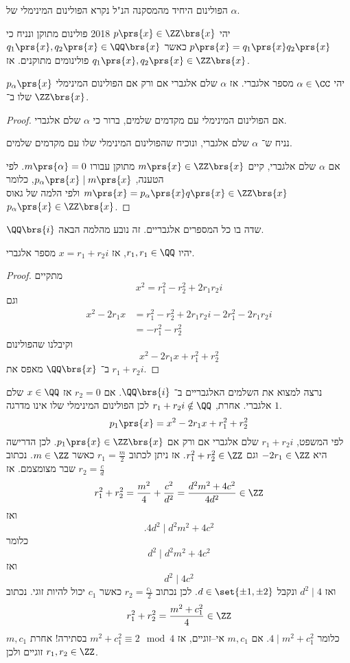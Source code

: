 \documentclass[a4paper,10pt,twoside,openany]{book}
\begin{document}
\begin{definition}
הפולינום היחיד מהמסקנה הנ"ל נקרא הפולינום המינימלי של
$\alpha$.
\end{definition}
\begin{lemma}[גאוס]
יהי
$p\prs{x} \in \ZZ\brs{x}$%
%
{2018}
פולינום מתוקן ונניח כי
$p\prs{x} = q_1\prs{x} q_2\prs{x}$
כאשר
$q_1\prs{x}, q_2\prs{x} \in \QQ\brs{x}$
פולינומים מתוקנים.
אז
$q_1\prs{x}, q_2\prs{x} \in \ZZ\brs{x}$.
\end{lemma}
\begin{proposition}
יהי
$\alpha \in \CC$
מספר אלגברי.
אז
$\alpha$
שלם אלגברי אם ורק אם הפולינום המינימלי
$p_{\alpha}\prs{x}$
שלו ב־%
$\ZZ\brs{x}$.
\end{proposition}

\begin{proof}
אם הפולינום המינימלי עם מקדמים שלמים, ברור כי
$\alpha$
שלם אלגברי.

נניח ש־%
$\alpha$
שלם אלגברי, ונוכיח שהפולינום המינימלי שלו עם מקדמים שלמים.

אם
$\alpha$
שלם אלגברי, קיים
$m\prs{x} \in \ZZ\brs{x}$
מתוקן עבורו
$m\prs{\alpha} = 0$.
לפי הטענה,
$p_{\alpha}\prs{x} \mid m\prs{x}$,
כלומר
$m\prs{x} = p_{\alpha}\prs{x} q\prs{x} \in \ZZ\brs{x}$
ולפי הלמה של גאוס
$p_{\alpha}\prs{x} \in \ZZ\brs{x}$.
\end{proof}

\begin{example}
$\QQ\brs{i}$
שדה בו כל המספרים אלגבריים.
זה נובע מהלמה הבאה.
\end{example}
\begin{lemma}
יהיו
$r_1,r_1 \in \QQ$,
אז
$x = r_1 + r_2 i$
מספר אלגברי.
\end{lemma}
\begin{proof}
מתקיים
\[x^2 = r_1^2 - r_2^2 + 2r_1 r_2 i\]
וגם
\begin{align*}
x^2 -2r_1 x &= r_1^2 - r_2^2 + 2r_1r_2 i - 2r_1^2 - 2r_1r_2 i \\&= -r_1^2 - r_2^2
\end{align*}
וקיבלנו שהפולינום
\[x^2 - 2r_1 x + r_1^2 + r_2^2\]
ב־%
$\QQ\brs{x}$
מאפס את
$r_1 + r_2 i$.
\end{proof}

\begin{example}
נרצה למצוא את השלמים האלגבריים ב־%
$\QQ\brs{i}$.
אם
$r_2 = 0$
אז
$x \in \QQ$
שלם אלגברי.
אחרת,
$r_1 + r_2 i \notin \QQ$
לכן הפולינום המינימלי שלו אינו מדרגה
$1$.
\[p_1\prs{x} = x^2 - 2r_1 x + r_1^2 + r_2^2\]
לפי המשפט,
$r_1 + r_2 i$
שלם אלגברי אם ורק אם
$p_1\prs{x} \in \ZZ\brs{x}$.
לכן הדרישה היא
$-2 r_1 \in \ZZ$
וגם
$r_1^2 + r_2^2 \in \ZZ$.
אז ניתן לכתוב
$r_1 = \frac{m}{2}$
כאשר
$m \in \ZZ$.
נכתוב
$r_2 = \frac{c}{d}$
שבר מצומצמם.
אז
\[r_1^2 + r_2^2 = \frac{m^2}{4} + \frac{c^2}{d^2} = \frac{d^2 m^2 + 4c^2}{4d^2} \in \ZZ\]
ואז
\[\text{.}4d^2 \mid d^2 m^2 + 4c^2\]
כלומר
\[d^2 \mid d^2 m^2 + 4c^2\]
ואז
\[d^2 \mid 4c^2\]
ואז
$d^2 \mid 4$
ונקבל
$d \in \set{\pm 1, \pm 2}$.
לכן נכתוב
$r_2 = \frac{c_1}{2}$
כאשר
$c_1$
יכול להיות זוגי.
נכתוב
\[r_1^2 + r_2^2 = \frac{m^2 + c_1^2}{4} \in \ZZ\]
כלומר
$4 \mid m^2 + c_1^2$.
אם
$m,c_1$
אי–זוגיים, אז
$m^2 + c_1^2 \equiv 2\mod{4}$
בסתירה!
אחרת
$m,c_1$
זוגיים ולכן
$r_1,r_2 \in \ZZ$.
\end{example}
\end{document}
